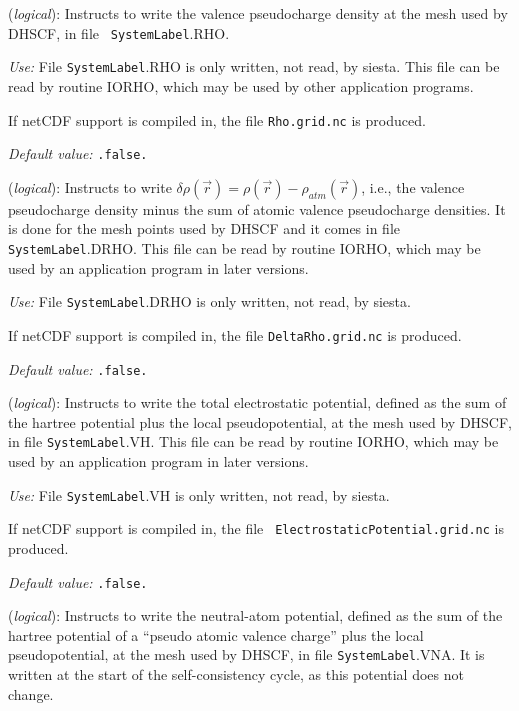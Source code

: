 \documentclass[11pt]{article}
\begin{document}
\begin{description}
\itemsep 10pt
\parsep 0pt

\item[{\bf SaveRho}] ({\it logical}):  Instructs to write the
  valence pseudocharge density at the mesh used by DHSCF, in file {\tt
    SystemLabel}.RHO.

{\it Use:} File {\tt SystemLabel}.RHO is only written, not read, by siesta.
This file can be read by routine IORHO, which may be used by other
application programs.

If netCDF support is compiled in, the file {\tt Rho.grid.nc} is produced.

{\it Default value:} {\tt .false.}


\item[{\bf SaveDeltaRho}] ({\it logical}):
Instructs to write $\delta \rho(\vec r) = \rho(\vec r) - \rho_{atm}(\vec r)$,
i.e., the valence pseudocharge density minus the sum of atomic valence
pseudocharge densities. It is done for the mesh points used by DHSCF and it
comes in file {\tt SystemLabel}.DRHO. This file can be read by routine IORHO,
which may be used by an application program in later versions.

{\it Use:} File {\tt SystemLabel}.DRHO is only written, not read, by siesta.

If netCDF support is compiled in, the file {\tt DeltaRho.grid.nc} is produced.

{\it Default value:} {\tt .false.}


\item[{\bf SaveElectrostaticPotential}] ({\it logical}):
Instructs to write the total electrostatic potential, defined as the
sum of the hartree potential plus the local pseudopotential, at the
mesh used by DHSCF,
in file {\tt SystemLabel}.VH. This file can be read by routine IORHO,
which may be used by an application program in later versions.

{\it Use:} File {\tt SystemLabel}.VH is only written, not read, by siesta.

If netCDF support is compiled in, the file {\tt
ElectrostaticPotential.grid.nc} is produced.

{\it Default value:} {\tt .false.}

\item[{\bf SaveNeutralAtomPotential}] ({\it logical}):
Instructs to write the neutral-atom potential, defined as the
sum of the hartree potential of a ``pseudo atomic valence charge''
plus the local pseudopotential, at the mesh used by DHSCF,
in file {\tt SystemLabel}.VNA. It is written at the start of the
self-consistency cycle, as this potential does not change.


\end{description}
\end{document}
